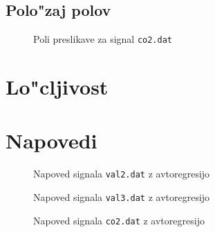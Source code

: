 \documentclass[a4paper,10pt]{article}
\begin{document}
\subsection{Polo"zaj polov}

\begin{figure}[h]
 
 \caption{Poli preslikave za signal \texttt{co2.dat}}
 \label{fig:roots-co2}
\end{figure}


\section{Lo"cljivost}

\section{Napovedi}


\begin{figure}[h]
 
 \caption{Napoved signala \texttt{val2.dat} z avtoregresijo}
 \label{fig:napoved-val2}
\end{figure}

\begin{figure}[h]
 
 \caption{Napoved signala \texttt{val3.dat} z avtoregresijo}
 \label{fig:napoved-val3}
\end{figure}


\begin{figure}[h]
 
 \caption{Napoved signala \texttt{co2.dat} z avtoregresijo}
 \label{fig:napoved-co2}
\end{figure}

 
\end{document}
